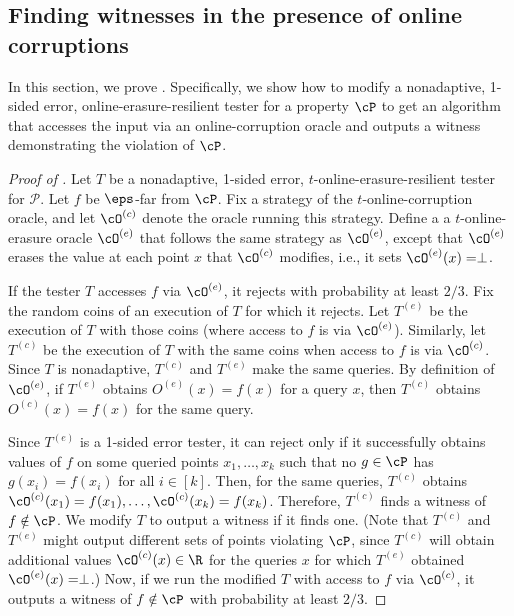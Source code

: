 \documentclass{toc}
\begin{document}
%
\subsection{Finding witnesses in the presence of online corruptions}\label{sec:detect}

In this section, we prove . Specifically, we show how to modify a nonadaptive, 1-sided error, online-erasure-resilient tester for a property $\cP$ to get an algorithm that accesses the input via an online-corruption oracle and outputs a witness demonstrating the violation of $\cP$. 


\begin{proof}[Proof of ]
    Let $T$ be a nonadaptive, 1-sided error, $t$-online-erasure-resilient tester for $\mathcal{P}$. Let $f$ be $\eps$-far from $\cP$. Fix a strategy of the $t$-online-corruption oracle, and let $\cO^{(c)}$ denote the oracle running this strategy. Define a a $t$-online-erasure oracle $\cO^{(e)}$ that follows the same strategy as  $\cO^{(e)}$, except that $\cO^{(e)}$ erases the value at each point $x$ that $\cO^{(c)}$ modifies,
%
i.e., it sets $\cO^{(e)}(x) = \perp$. 
    
    If the tester $T$ accesses $f$ via $\cO^{(e)}$, it rejects with probability at least $2/3$.
    Fix the random coins of an execution of $T$ for which it rejects. 
    Let $T^{(e)}$ be the execution of $T$ with those coins (where access to $f$ is via $\cO^{(e)}$). Similarly, let $T^{(c)}$ be the execution of $T$ with the same coins when access to $f$ is via $\cO^{(c)}$. 
    Since $T$ is nonadaptive, $T^{(c)}$ and $T^{(e)}$ make the same queries. By definition of $\cO^{(e)}$, if $T^{(e)}$ obtains $O^{(e)}(x) = f(x)$ for a query $x$, then $T^{(c)}$ obtains $O^{(c)}(x) = f(x)$ for the same query. 
  
    Since $T^{(e)}$ is a 1-sided error tester, it can reject only if it successfully obtains values of $f$ on some queried points $x_1, \dots, x_k$ such that no $g \in \cP$ has $g(x_i) =f(x_i)$ for all $i \in [k]$. Then, for the same queries,  $T^{(c)}$ obtains $\cO^{(c)}(x_1) = f(x_1), \dots, \cO^{(c)}(x_k)=f(x_k)$.  Therefore, $T^{(c)}$ finds a witness of $f \notin \cP$. We modify $T$ to output a witness if it finds one. (Note that $T^{(c)}$ and $T^{(e)}$ might output different sets of points violating $\cP$, since $T^{(c)}$ will obtain additional values $\cO^{(c)}(x) \in \R$ for the queries $x$ for which $T^{(e)}$ obtained $\cO^{(e)}(x) = \perp$.) Now, if we run the modified $T$ with access to $f$ via $\cO^{(c)}$, it outputs a witness of $f \notin \cP$ with probability at least $2/3$. 
\end{proof}
\end{document}
